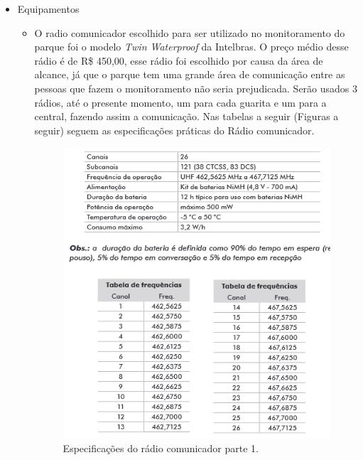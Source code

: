 \begin{itemize}
	\item Equipamentos
	
	\begin{itemize}
	\item O radio comunicador escolhido para ser utilizado no monitoramento do parque foi o modelo \textit{Twin Waterproof} da Intelbras. O preço médio desse rádio é de R\$ 450,00, esse rádio foi escolhido por causa da área de alcance, já que o parque tem uma grande área de  comunicação entre as pessoas que fazem o monitoramento não seria prejudicada. Serão usados 3 rádios, até o presente momento, um para cada guarita e um para a central, fazendo assim a comunicação.  Nas tabelas a seguir (Figuras a seguir)  seguem as especificações práticas do Rádio comunicador.
	
	\begin{figure}[H]
	 \centering
	\label{Especificações do rádio comunicador parte 1}
	 \includegraphics[keepaspectratio=true,scale=0.8]{monitoramento/27.png}
	 \caption{Especificações do rádio comunicador parte 1.}
	\end{figure}
	

\end{itemize}
\end{itemize}
